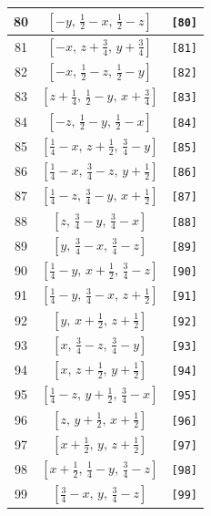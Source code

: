 \documentclass[fleqn,8pt]{jsarticle}
\begin{document}
\begin{longtable}{ccc}
80 & $\left[ - y,\, \frac{1}{2} - x,\, \frac{1}{2} - z \right]$ & {\tt [80]} \\ \hline
81 & $\left[ - x,\, z + \frac{3}{4},\, y + \frac{3}{4} \right]$ & {\tt [81]} \\ \hline
82 & $\left[ - x,\, \frac{1}{2} - z,\, \frac{1}{2} - y \right]$ & {\tt [82]} \\ \hline
83 & $\left[ z + \frac{1}{4},\, \frac{1}{2} - y,\, x + \frac{3}{4} \right]$ & {\tt [83]} \\ \hline
84 & $\left[ - z,\, \frac{1}{2} - y,\, \frac{1}{2} - x \right]$ & {\tt [84]} \\ \hline
85 & $\left[ \frac{1}{4} - x,\, z + \frac{1}{2},\, \frac{3}{4} - y \right]$ & {\tt [85]} \\ \hline
86 & $\left[ \frac{1}{4} - x,\, \frac{3}{4} - z,\, y + \frac{1}{2} \right]$ & {\tt [86]} \\ \hline
87 & $\left[ \frac{1}{4} - z,\, \frac{3}{4} - y,\, x + \frac{1}{2} \right]$ & {\tt [87]} \\ \hline
88 & $\left[ z,\, \frac{3}{4} - y,\, \frac{3}{4} - x \right]$ & {\tt [88]} \\ \hline
89 & $\left[ y,\, \frac{3}{4} - x,\, \frac{3}{4} - z \right]$ & {\tt [89]} \\ \hline
90 & $\left[ \frac{1}{4} - y,\, x + \frac{1}{2},\, \frac{3}{4} - z \right]$ & {\tt [90]} \\ \hline
91 & $\left[ \frac{1}{4} - y,\, \frac{3}{4} - x,\, z + \frac{1}{2} \right]$ & {\tt [91]} \\ \hline
92 & $\left[ y,\, x + \frac{1}{2},\, z + \frac{1}{2} \right]$ & {\tt [92]} \\ \hline
93 & $\left[ x,\, \frac{3}{4} - z,\, \frac{3}{4} - y \right]$ & {\tt [93]} \\ \hline
94 & $\left[ x,\, z + \frac{1}{2},\, y + \frac{1}{2} \right]$ & {\tt [94]} \\ \hline
95 & $\left[ \frac{1}{4} - z,\, y + \frac{1}{2},\, \frac{3}{4} - x \right]$ & {\tt [95]} \\ \hline
96 & $\left[ z,\, y + \frac{1}{2},\, x + \frac{1}{2} \right]$ & {\tt [96]} \\ \hline
97 & $\left[ x + \frac{1}{2},\, y,\, z + \frac{1}{2} \right]$ & {\tt [97]} \\ \hline
98 & $\left[ x + \frac{1}{2},\, \frac{1}{4} - y,\, \frac{3}{4} - z \right]$ & {\tt [98]} \\ \hline
99 & $\left[ \frac{3}{4} - x,\, y,\, \frac{3}{4} - z \right]$ & {\tt [99]} \\ \hline

\end{longtable}
\end{document}
